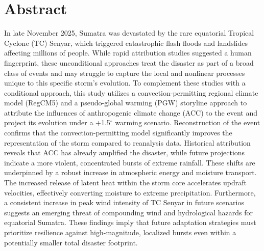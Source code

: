\chapter*{Abstract} 
In late November 2025, Sumatra was devastated by the rare equatorial Tropical Cyclone (TC) Senyar, which triggered catastrophic flash floods and landslides affecting millions of people. While rapid attribution studies suggested a human fingerprint, these unconditional approaches treat the disaster as part of a broad class of events and may struggle to capture the local and nonlinear processes unique to this specific storm's evolution. To complement these studies with a conditional approach, this study utilizes a convection-permitting regional climate model (RegCM5) and a pseudo-global warming (PGW) storyline approach to attribute the influences of anthropogenic climate change (ACC) to the event and project its evolution under a +1.5$^\circ$ warming scenario. Reconstruction of the event confirms that the convection-permitting model significantly improves the representation of the storm compared to reanalysis data. Historical attribution reveals that ACC has already amplified the disaster, while future projections indicate a more violent, concentrated bursts of extreme rainfall. These shifts are underpinned by a robust increase in atmospheric energy and moisture transport. The increased release of latent heat within the storm core accelerates updraft velocities, effectively converting moisture to extreme precipitation. Furthermore, a consistent increase in peak wind intensity of TC Senyar in future scenarios suggests an emerging threat of compounding wind and hydrological hazards for equatorial Sumatra. These findings imply that future adaptation strategies must prioritize resilience against high-magnitude, localized bursts even within a potentially smaller total disaster footprint.




